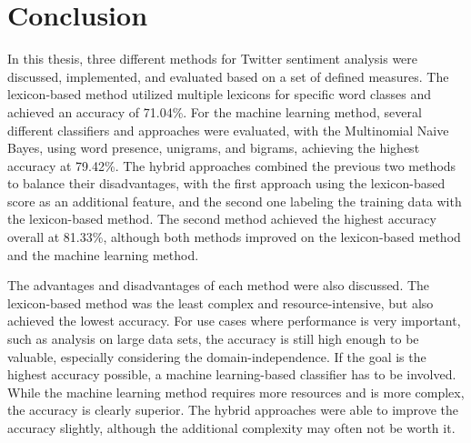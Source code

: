 \chapter{Conclusion}
\label{cha:Chapter5_Conclusion}

\iffalse

Length: 1-2 pages

Effort: 1-2 days


Zusammenfassung der Ergebnisse, Ausblick --> was kann man noch machen, auf Ergebnisse aufbauen, weiterfuehrende Themen

Beim Erstellen der Arbeit --> nicht jeder Idee hinterherrennen, eher dann fuer Conclusion

Implementation source code --> muss nicht sein, kann auch ein link auf github sein

\fi

In this thesis, three different methods for Twitter sentiment analysis were discussed, implemented, and evaluated based on a set of defined measures. The lexicon-based method utilized multiple lexicons for specific word classes and achieved an accuracy of 71.04\%. For the machine learning method, several different classifiers and approaches were evaluated, with the Multinomial Naive Bayes, using word presence, unigrams, and bigrams, achieving the highest accuracy at 79.42\%. The hybrid approaches combined the previous two methods to balance their disadvantages, with the first approach using the lexicon-based score as an additional feature, and the second one labeling the training data with the lexicon-based method. The second method achieved the highest accuracy overall at 81.33\%, although both methods improved on the lexicon-based method and the machine learning method.

The advantages and disadvantages of each method were also discussed. The lexicon-based method was the least complex and resource-intensive, but also achieved the lowest accuracy. For use cases where performance is very important, such as analysis on large data sets, the accuracy is still high enough to be valuable, especially considering the domain-independence. If the goal is the highest accuracy possible, a machine learning-based classifier has to be involved. While the machine learning method requires more resources and is more complex, the accuracy is clearly superior. The hybrid approaches were able to improve the accuracy slightly, although the additional complexity may often not be worth it.

